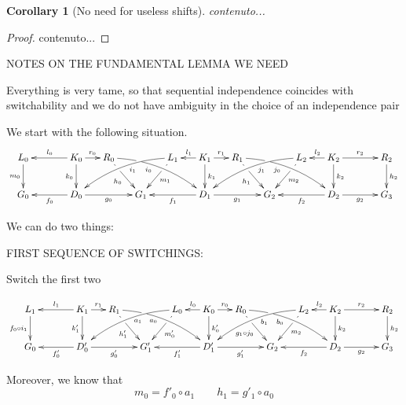\documentclass[a4paper]{article}
\newtheorem{corollary}[theorem]{Corollary}
\theoremstyle{definition}
\begin{document}
\begin{corollary}[No need for useless shifts]
	contenuto...
\end{corollary}
\begin{proof}
	contenuto...
\end{proof}
\newpage


NOTES ON THE FUNDAMENTAL LEMMA WE NEED

Everything is very tame, so that sequential independence coincides with switchability and we do not have ambiguity in the choice of an independence pair


We start with the following situation.
	\[\xymatrix@C=15pt{L_0\ar[d]_{m_0}&& K_0 \ar[d]_{k_0}\ar[ll]_{l_0} \ar[r]^{r_0} & R_0 \ar@/^.35cm/[drrr]_(.4){i_0}|(.285)\hole \ar[dr]|(.28)\hole_{h_0} && L_1 \ar@/_.35cm/[dlll]^(.4){i_1} \ar[dl]|(.28)\hole^{m_1}& K_1 \ar[d]^{k_1}\ar[l]_{l_1} \ar[r]^{r_1} & R_1 \ar[dr]|(.28)\hole_{h_1} \ar@/^.35cm/[drrr]_(.4){j_0}|(.285)\hole  && L_2 \ar@/_.35cm/[dlll]^(.4){j_1} \ar[dl]|(.28)\hole^{m_2}& K_2 \ar[d]^{k_2}\ar[l]_{l_2} \ar[rr]^{r_2} && R_2 \ar[d]^{h_2} \\G_0 && \ar[ll]^{f_0} D_0 \ar[rr]_{g_0}&& G_1  && \ar[ll]^{f_1} D_1 \ar[rr]_{g_1}&& G_2 && \ar[ll]^{f_2} D_2 \ar[rr]_{g_2}&& G_3 }\]
	
	We can do two things:
	
	FIRST SEQUENCE OF SWITCHINGS:
	
	Switch the first two
	

	\[\xymatrix@C=15pt{L_1\ar[d]_{f_0\circ i_1}&& K_1 \ar[d]_{k'_1}\ar[ll]_{l_1} \ar[r]^{r_1} & R_1 \ar@/^.35cm/[drrr]_(.4){a_0}|(.285)\hole \ar[dr]|(.28)\hole_{h'_1} && L_0 \ar@/_.35cm/[dlll]^(.4){a_1} \ar[dl]|(.28)\hole^{m'_0}& K_0 \ar[d]^{k'_0}\ar[l]_{l_0} \ar[r]^{r_0} & R_0 \ar[dr]|(.28)\hole_{g_1\circ j_0} \ar@/^.35cm/[drrr]_(.4){b_0}|(.285)\hole  && L_2 \ar@/_.35cm/[dlll]^(.4){b_1} \ar[dl]|(.28)\hole^{m_2}& K_2 \ar[d]^{k_2}\ar[l]_{l_2} \ar[rr]^{r_2} && R_2 \ar[d]^{h_2} \\G_0 && \ar[ll]^{f'_0} D'_0 \ar[rr]_{g'_0}&& G'_1  && \ar[ll]^{f'_1} D'_1 \ar[rr]_{g'_1}&& G_2 && \ar[ll]^{f_2} D_2 \ar[rr]_{g_2}&& G_3 }\]
	
	Moreover, we know that
	\[m_0=f'_0\circ a_1 \qquad h_1=g'_1\circ a_0\]
	
\end{document}

